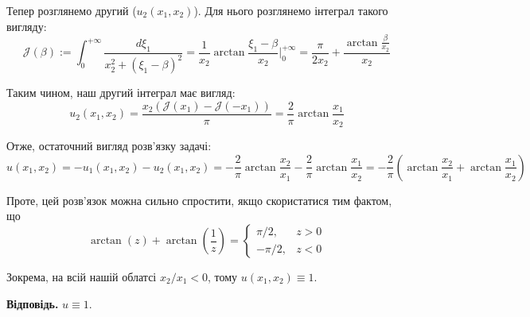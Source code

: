 \documentclass{hw_template}
\begin{document}
Тепер розглянемо другий ($u_2(x_1,x_2)$). Для нього розглянемо інтеграл такого вигляду:
\begin{equation*}
    \mathcal{J}(\beta) := \int_0^{+\infty}\frac{d\xi_1}{x_2^2+(\xi_1-\beta)^2} = \frac{1}{x_2}\arctan \frac{\xi_1-\beta}{x_2}\Big|_{0}^{+\infty} = \frac{\pi}{2x_2} + \frac{\arctan \frac{\beta}{x_2}}{x_2}
\end{equation*}

Таким чином, наш другий інтеграл має вигляд:
\begin{equation*}
    u_2(x_1,x_2) = \frac{x_2(\mathcal{J}(x_1) - \mathcal{J}(-x_1))}{\pi} = \frac{2}{\pi}\arctan \frac{x_1}{x_2}
\end{equation*}

Отже, остаточний вигляд розв'язку задачі:
\begin{equation*}
    u(x_1,x_2) = -u_1(x_1,x_2)-u_2(x_1,x_2) = -\frac{2}{\pi}\arctan \frac{x_2}{x_1} - \frac{2}{\pi}\arctan \frac{x_1}{x_2} = \boxed{-\frac{2}{\pi}\left(\arctan \frac{x_2}{x_1} + \arctan \frac{x_1}{x_2}\right)}
\end{equation*} 

Проте, цей розв'язок можна сильно спростити, якщо скористатися тим фактом, що 
\begin{equation*}
    \arctan(z) + \arctan\left(\frac{1}{z}\right) = \begin{cases}
        \pi/2, & z > 0 \\
        -\pi/2, & z < 0
    \end{cases}
\end{equation*}

Зокрема, на всій нашій облатсі $x_2/x_1 < 0$, тому $u(x_1,x_2) \equiv 1$.

\textbf{Відповідь.} $u \equiv 1$.

\newpage
\end{document}
